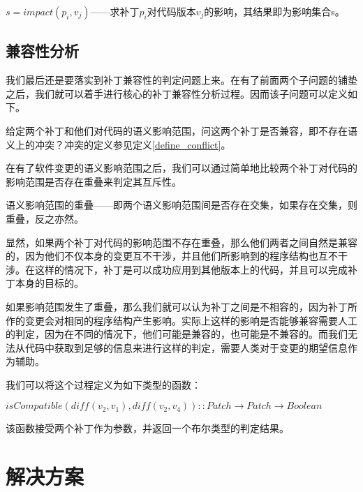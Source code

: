 \begin{definition}
	\label {define_impact}
	$s = impact(p_i,v_j)$——求补丁$p_i$对代码版本$v_j$的影响，其结果即为影响集合s。
\end{definition}

\subsection{兼容性分析}

我们最后还是要落实到补丁兼容性的判定问题上来。在有了前面两个子问题的铺垫之后，我们就可以着手进行核心的补丁兼容性分析过程。因而该子问题可以定义如下。

\begin{problem}
	给定两个补丁和他们对代码的语义影响范围，问这两个补丁是否兼容，即不存在语义上的冲突？冲突的定义参见定义\ref {define_conflict}。
\end{problem}

在有了软件变更的语义影响范围之后，我们可以通过简单地比较两个补丁对代码的影响范围是否存在重叠来判定其互斥性。

\begin{definition}
	语义影响范围的重叠——即两个语义影响范围间是否存在交集，如果存在交集，则重叠，反之亦然。
\end{definition}

显然，如果两个补丁对代码的影响范围不存在重叠，那么他们两者之间自然是兼容的，因为他们不仅本身的变更互不干涉，并且他们所影响到的程序结构也互不干涉。在这样的情况下，补丁是可以成功应用到其他版本上的代码，并且可以完成补丁本身的目标的。

如果影响范围发生了重叠，那么我们就可以认为补丁之间是不相容的，因为补丁所作的变更会对相同的程序结构产生影响。实际上这样的影响是否能够兼容需要人工的判定，因为在不同的情况下，他们可能是兼容的，也可能是不兼容的。而我们无法从代码中获取到足够的信息来进行这样的判定，需要人类对于变更的期望信息作为辅助。

我们可以将这个过程定义为如下类型的函数：

\begin{definition}
	$isCompatible(diff(v_2,v_1),diff(v_2,v_4)) :: Patch \rightarrow Patch \rightarrow Boolean$
\end{definition}

该函数接受两个补丁作为参数，并返回一个布尔类型的判定结果。


\section{解决方案}

